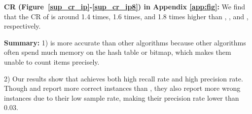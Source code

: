 \noindent\textbf{CR (Figure~\ref{sup_cr_ip}-\ref{sup_cr_ip8}) in Appendix \ref{app:fig}:}
We find that the CR of \sketchname{} is around 1.4 times, 1.6 times, and 1.8 times higher than \supolf, \suptlf{}, and \supopen{}, respectively.

\noindent\textbf{Summary:} 
1) \sketchname{} is more accurate than other algorithms because other algorithms often spend much memory on the hash table or bitmap, which makes them unable to count items precisely.

2) Our results show that \sketchname{} achieves both high recall rate and high precision rate. Though \supolf{} and \suptlf{} report more correct instances than \supopen{}, they also report more wrong instances due to their low sample rate, making their precision rate lower than 0.03. 